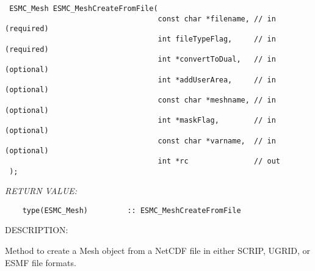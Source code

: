   
\begin{verbatim} ESMC_Mesh ESMC_MeshCreateFromFile(
                                   const char *filename, // in (required)
                                   int fileTypeFlag,     // in (required)
                                   int *convertToDual,   // in (optional)
                                   int *addUserArea,     // in (optional)
                                   const char *meshname, // in (optional)
                                   int *maskFlag,        // in (optional)
                                   const char *varname,  // in (optional)
                                   int *rc               // out
 );\end{verbatim}{\em RETURN VALUE:}
\begin{verbatim}    type(ESMC_Mesh)         :: ESMC_MeshCreateFromFile\end{verbatim}
{\sf DESCRIPTION:\\ }


  
   Method to create a Mesh object from a NetCDF file in either SCRIP, UGRID,
   or ESMF file formats.
  
